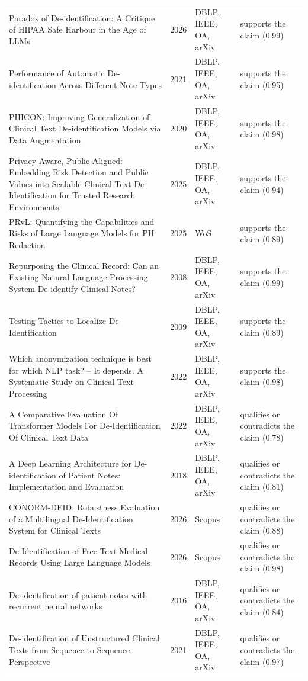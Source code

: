 \begin{longtable}{@{}%
  >{\raggedright\arraybackslash}p{}c%
  >{\raggedright\arraybackslash}p{}%
  >{\raggedright\arraybackslash}p{}@{}}
Paradox of De-identification: A Critique of HIPAA Safe Harbour in the Age of LLMs & 2026 & DBLP, IEEE, OA, arXiv & supports the claim (0.99) \\
Performance of Automatic De-identification Across Different Note Types & 2021 & DBLP, IEEE, OA, arXiv & supports the claim (0.95) \\
PHICON: Improving Generalization of Clinical Text De-identification Models via Data Augmentation & 2020 & DBLP, IEEE, OA, arXiv & supports the claim (0.98) \\
Privacy-Aware, Public-Aligned: Embedding Risk Detection and Public Values into Scalable Clinical Text De-Identification for Trusted Research Environments & 2025 & DBLP, IEEE, OA, arXiv & supports the claim (0.94) \\
PRvL: Quantifying the Capabilities and Risks of Large Language Models for PII Redaction & 2025 & WoS & supports the claim (0.89) \\
Repurposing the Clinical Record: Can an Existing Natural Language Processing System De-identify Clinical Notes? & 2008 & DBLP, IEEE, OA, arXiv & supports the claim (0.99) \\
Testing Tactics to Localize De-Identification & 2009 & DBLP, IEEE, OA, arXiv & supports the claim (0.89) \\
Which anonymization technique is best for which NLP task? -- It depends. A Systematic Study on Clinical Text Processing & 2022 & DBLP, IEEE, OA, arXiv & supports the claim (0.98) \\
A Comparative Evaluation Of Transformer Models For De-Identification Of Clinical Text Data & 2022 & DBLP, IEEE, OA, arXiv & qualifies or contradicts the claim (0.78) \\
A Deep Learning Architecture for De-identification of Patient Notes: Implementation and Evaluation & 2018 & DBLP, IEEE, OA, arXiv & qualifies or contradicts the claim (0.81) \\
CONORM-DEID: Robustness Evaluation of a Multilingual De-Identification System for Clinical Texts & 2026 & Scopus & qualifies or contradicts the claim (0.88) \\
De-Identification of Free-Text Medical Records Using Large Language Models & 2026 & Scopus & qualifies or contradicts the claim (0.98) \\
De-identification of patient notes with recurrent neural networks & 2016 & DBLP, IEEE, OA, arXiv & qualifies or contradicts the claim (0.84) \\
De-identification of Unstructured Clinical Texts from Sequence to Sequence Perspective & 2021 & DBLP, IEEE, OA, arXiv & qualifies or contradicts the claim (0.97) \\

\end{longtable}
